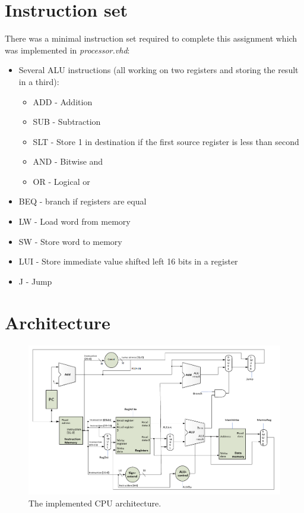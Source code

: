 \section{Instruction set}
There was a minimal instruction set required to complete this assignment which was implemented in \emph{processor.vhd}:
\begin{itemize}
    \item Several ALU instructions (all working on two registers and storing the result in a third):
        \begin{itemize}
            \item ADD - Addition
            \item SUB - Subtraction
            \item SLT - Store 1 in destination if the first source register is less than second
            \item AND - Bitwise and
            \item OR  - Logical or
        \end{itemize}
    \item BEQ - branch if registers are equal
    \item LW - Load word from memory
    \item SW - Store word to memory
    \item LUI - Store immediate value shifted left 16 bits in a register
    \item J - Jump
\end{itemize}

\section{Architecture}
\begin{figure}[ht]
    \centering
    \includegraphics[scale=0.3]{figures/cpu.png}
    \caption{\label{fig:cpuArchitecture}The implemented CPU architecture.} 
\end{figure}

